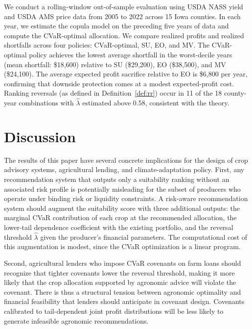 \documentclass[12pt,review,authoryear]{elsarticle}
\numberwithin{equation}{section}
\begin{document}
We conduct a rolling-window out-of-sample evaluation using USDA NASS
yield and USDA AMS price data from 2005 to 2022 across 15 Iowa counties.
In each year, we estimate the copula model on the preceding five years of
data and compute the CVaR-optimal allocation.  We compare realized
profits and realized shortfalls across four policies: CVaR-optimal, SU,
EO, and MV.  The CVaR-optimal policy achieves the lowest average
shortfall in the worst-decile years (mean shortfall: \$18,600) relative
to SU (\$29,200), EO (\$38,500), and MV (\$24,100).  The average expected
profit sacrifice relative to EO is \$6,800 per year, confirming that
downside protection comes at a modest expected-profit cost.  Ranking
reversals (as defined in Definition~\ref{def:rr}) occur in 11 of the 18
county-year combinations with $\hat{\lambda}$ estimated above 0.58,
consistent with the theory.

\section{Discussion}
\label{sec:discussion}

The results of this paper have several concrete implications for the design
of crop advisory systems, agricultural lending, and climate-adaptation
policy.  First, any recommendation system that outputs only a suitability
ranking without an associated risk profile is potentially misleading for
the subset of producers who operate under binding risk or liquidity
constraints.  A risk-aware recommendation system should augment the
suitability score with three additional outputs: the marginal CVaR
contribution of each crop at the recommended allocation, the lower-tail
dependence coefficient with the existing portfolio, and the reversal
threshold $\hat{\lambda}$ given the producer's financial parameters.  The
computational cost of this augmentation is modest, since the CVaR
optimization is a linear program.

Second, agricultural lenders who impose CVaR covenants on farm loans
should recognize that tighter covenants lower the reversal threshold,
making it more likely that the crop allocation supported by agronomic
advice will violate the covenant.  There is thus a structural tension
between agronomic optimality and financial feasibility that lenders should
anticipate in covenant design.  Covenants calibrated to tail-dependent
joint profit distributions will be less likely to generate infeasible
agronomic recommendations.
\end{document}
